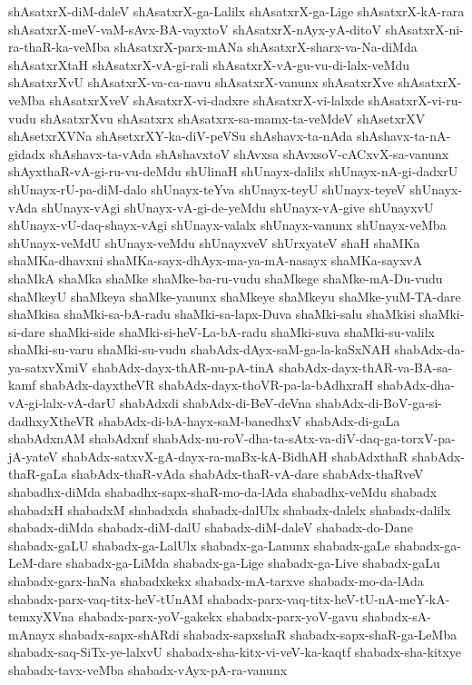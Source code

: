 {shAsatxrX-diM-daleV
shAsatxrX-ga-Lalilx
shAsatxrX-ga-Lige
shAsatxrX-kA-rara
shAsatxrX-meV-vaM-sAvx-BA-vayxtoV
shAsatxrX-nAyx-yA-ditoV
shAsatxrX-ni-ra-thaR-ka-veMba
shAsatxrX-parx-mANa
shAsatxrX-sharx-va-Na-diMda
shAsatxrXtaH
shAsatxrX-vA-gi-rali
shAsatxrX-vA-gu-vu-di-lalx-veMdu
shAsatxrXvU
shAsatxrX-va-ca-navu
shAsatxrX-vanunx
shAsatxrXve
shAsatxrX-veMba
shAsatxrXveV
shAsatxrX-vi-dadxre
shAsatxrX-vi-lalxde
shAsatxrX-vi-ru-vudu
shAsatxrXvu
shAsatxrx
shAsatxrx-sa-mamx-ta-veMdeV
shAsetxrXV
shAsetxrXVNa
shAsetxrXY-ka-diV-peVSu
shAshavx-ta-nAda
shAshavx-ta-nA-gidadx
shAshavx-ta-vAda
shAshavxtoV
shAvxsa
shAvxsoV-cACxvX-sa-vanunx
shAyxthaR-vA-gi-ru-vu-deMdu
shUlinaH
shUnayx-dalilx
shUnayx-nA-gi-dadxrU
shUnayx-rU-pa-diM-dalo
shUnayx-teYva
shUnayx-teyU
shUnayx-teyeV
shUnayx-vAda
shUnayx-vAgi
shUnayx-vA-gi-de-yeMdu
shUnayx-vA-give
shUnayxvU
shUnayx-vU-daq-shayx-vAgi
shUnayx-valalx
shUnayx-vanunx
shUnayx-veMba
shUnayx-veMdU
shUnayx-veMdu
shUnayxveV
shUrxyateV
shaH
shaMKa
shaMKa-dhavxni
shaMKa-sayx-dhAyx-ma-ya-mA-nasayx
shaMKa-sayxvA
shaMkA
shaMka
shaMke
shaMke-ba-ru-vudu
shaMkege
shaMke-mA-Du-vudu
shaMkeyU
shaMkeya
shaMke-yanunx
shaMkeye
shaMkeyu
shaMke-yuM-TA-dare
shaMkisa
shaMki-sa-bA-radu
shaMki-sa-lapx-Duva
shaMki-salu
shaMkisi
shaMki-si-dare
shaMki-side
shaMki-si-heV-La-bA-radu
shaMki-suva
shaMki-su-valilx
shaMki-su-varu
shaMki-su-vudu
shabAdx-dAyx-saM-ga-la-kaSxNAH
shabAdx-da-ya-satxvXmiV
shabAdx-dayx-thAR-nu-pA-tinA
shabAdx-dayx-thAR-va-BA-sa-kamf
shabAdx-dayxtheVR
shabAdx-dayx-thoVR-pa-la-bAdhxraH
shabAdx-dha-vA-gi-lalx-vA-darU
shabAdxdi
shabAdx-di-BeV-deVna
shabAdx-di-BoV-ga-si-dadhxyXtheVR
shabAdx-di-bA-hayx-saM-banedhxV
shabAdx-di-gaLa
shabAdxnAM
shabAdxnf
shabAdx-nu-roV-dha-ta-sAtx-va-diV-daq-ga-torxV-pa-jA-yateV
shabAdx-satxvX-gA-dayx-ra-maBx-kA-BidhAH
shabAdxthaR
shabAdx-thaR-gaLa
shabAdx-thaR-vAda
shabAdx-thaR-vA-dare
shabAdx-thaRveV
shabadhx-diMda
shabadhx-sapx-shaR-mo-da-lAda
shabadhx-veMdu
shabadx
shabadxH
shabadxM
shabadxda
shabadx-dalUlx
shabadx-dalelx
shabadx-dalilx
shabadx-diMda
shabadx-diM-dalU
shabadx-diM-daleV
shabadx-do-Dane
shabadx-gaLU
shabadx-ga-LalUlx
shabadx-ga-Lanunx
shabadx-gaLe
shabadx-ga-LeM-dare
shabadx-ga-LiMda
shabadx-ga-Lige
shabadx-ga-Live
shabadx-gaLu
shabadx-garx-haNa
shabadxkekx
shabadx-mA-tarxve
shabadx-mo-da-lAda
shabadx-parx-vaq-titx-heV-tUnAM
shabadx-parx-vaq-titx-heV-tU-nA-meY-kA-temxyXVna
shabadx-parx-yoV-gakekx
shabadx-parx-yoV-gavu
shabadx-sA-mAnayx
shabadx-sapx-shARdi
shabadx-sapxshaR
shabadx-sapx-shaR-ga-LeMba
shabadx-saq-SiTx-ye-lalxvU
shabadx-sha-kitx-vi-veV-ka-kaqtf
shabadx-sha-kitxye
shabadx-tavx-veMba
shabadx-vAyx-pA-ra-vanunx
}
